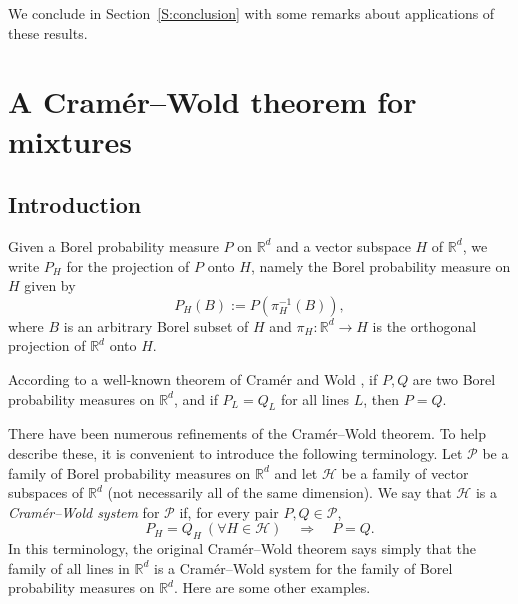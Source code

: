 \documentclass[11pt]{amsart}
\theoremstyle{plain}
\theoremstyle{remark}
\newcommand{\RR}{\mathbb{R}}
\newcommand{\cH}{\mathcal{H}}
\newcommand{\cP}{\mathcal{P}}
\begin{document}
We conclude in Section~\ref{S:conclusion} with some remarks
about applications of these results.	
	
	
	
\section{A Cram\'er--Wold theorem for mixtures}\label{S:mixtures}
	
\subsection{Introduction}
	
Given a Borel probability measure $P$ on $\RR^d$ and a vector subspace $H$ of $\RR^d$,
we write $P_H$ for the projection of $P$ onto $H$, namely the Borel probability measure on $H$ given by
\[
P_H(B):=P(\pi_H^{-1}(B)),
\]
where $B$ is an arbitrary Borel subset of $H$
and $\pi_H:\RR^d\to H$ is the orthogonal projection of $\RR^d$ onto $H$.
	
According to a well-known theorem of Cram\'er and Wold \cite{CW36}, 
if $P,Q$ are two Borel probability measures on $\RR^d$, 
and if $P_L=Q_L$ for all lines $L$, then $P=Q$.
	
There have been numerous refinements of the Cram\'er--Wold theorem.
To help describe these, it is convenient to introduce the following terminology.
Let  $\cP$ be a family of Borel probability measures on $\RR^d$ 
and let $\cH$ be a family of vector subspaces of $\RR^d$ (not necessarily all of the same dimension).
We say that $\cH$ is a \emph{Cram\'er--Wold system}  for $\cP$ if, for every pair $P,Q\in\cP$,
\[
P_H=Q_H ~(\forall H\in \cH)\quad\Rightarrow\quad P=Q.
\]
In this terminology, the original Cram\'er--Wold theorem says 
simply that the family of all lines in $\RR^d$ is a Cram\'er--Wold
system for the family of  Borel probability measures on $\RR^d$.
Here are some other examples.
	
\end{document}
